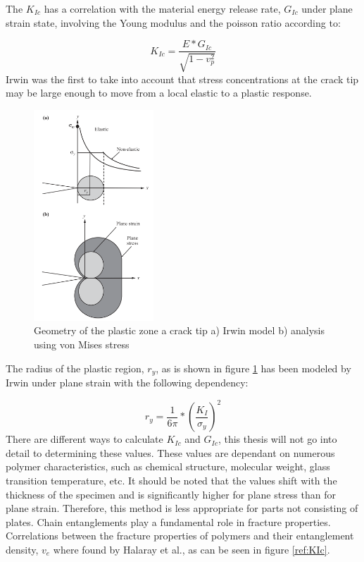 The  $K_{Ic}$ has a correlation with the material energy release rate, $G_{Ic}$ under plane strain state, involving the Young modulus and the poisson ratio according to: 

\begin{equation} \label{eqn:crazecriterion}
K_{Ic}=\frac{E*G_{Ic}}{\sqrt{1-v^2_p}}
\end{equation}
Irwin was the first to take into account that stress concentrations at the crack tip may be large enough to move from a local elastic to a plastic response. 

\begin{figure}[H]
    \centering
    \includegraphics[width=0.4\textwidth]{chapter_2/figures/Crackstress.png}
    \caption{Geometry of the plastic zone a crack tip a) Irwin model b) analysis using von Mises stress\cite{Halary2011PolymerMaterials}}
    \label{fig:stresscrack}
\end{figure}
The radius of the plastic region, $r_y$, as is shown in figure \ref{fig:stresscrack} has been modeled by Irwin under plane strain with the following dependency:

\begin{equation} \label{eqn:crazecriterion}
r_y=\frac{1}{6\pi}*\left(\frac{K_I}{\sigma_y}\right)^2
\end{equation}There are different ways to calculate $K_{Ic}$ and  $G_{Ic}$, this thesis will not go into detail to determining these values. These values are dependant on numerous polymer characteristics, such as chemical structure, molecular weight, glass transition temperature, etc. It should be noted that the values shift with the thickness of the specimen and is significantly higher for plane stress than for plane strain. Therefore, this method is less appropriate for parts not consisting of plates. 
Chain entanglements play a fundamental role in fracture properties. Correlations between the fracture properties of polymers and their entanglement density, $v_e$ where found by Halaray et al., as can be seen in figure \ref{ref:KIc}.  

